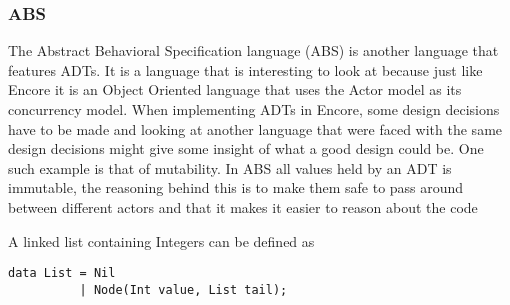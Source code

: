 \documentclass[10pt]{report}
\begin{document}
\subsubsection{ABS}
\par{The Abstract Behavioral Specification language\cite{ABS} (ABS) is another language that features ADTs. It is a language that is interesting to look at because just like Encore it is an Object Oriented language that uses the Actor model as its concurrency model. When implementing ADTs in Encore, some design decisions have to be made and looking at another language that were faced with the same design decisions might give some insight of what a good design could be. One such example is that of mutability. In ABS all values held by an ADT is immutable, the reasoning behind this is to make them safe to pass around between different actors and that it makes it easier to reason about the code\cite{ABSmut}}
\par{A linked list containing Integers can be defined as}
\begin{lstlisting}[language=encore,caption={Linked list in ABS}]
data List = Nil
          | Node(Int value, List tail);
\end{lstlisting}
\end{document}
